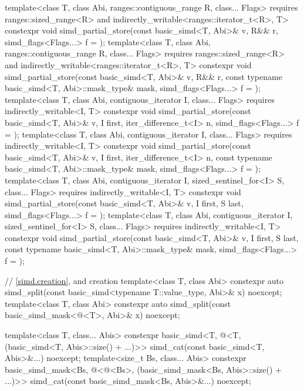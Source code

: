\begin{codeblock}
{  template<class T, class Abi, ranges::contiguous_range R, class... Flags>
    requires ranges::sized_range<R> and indirectly_writable<ranges::iterator_t<R>, T>
    constexpr void simd_partial_store(const basic_simd<T, Abi>& v, R&& r, simd_flags<Flags...> f = {});
  template<class T, class Abi, ranges::contiguous_range R, class... Flags>
    requires ranges::sized_range<R> and indirectly_writable<ranges::iterator_t<R>, T>
    constexpr void simd_partial_store(const basic_simd<T, Abi>& v, R&& r,
                            const typename basic_simd<T, Abi>::mask_type& mask,
                            simd_flags<Flags...> f = {});
  template<class T, class Abi, contiguous_iterator I, class... Flags>
    requires indirectly_writable<I, T>
    constexpr void simd_partial_store(const basic_simd<T, Abi>& v, I first, iter_difference_t<I> n,
                            simd_flags<Flags...> f = {});
  template<class T, class Abi, contiguous_iterator I, class... Flags>
    requires indirectly_writable<I, T>
    constexpr void simd_partial_store(const basic_simd<T, Abi>& v, I first, iter_difference_t<I> n,
                            const typename basic_simd<T, Abi>::mask_type& mask,
                            simd_flags<Flags...> f = {});
  template<class T, class Abi, contiguous_iterator I, sized_sentinel_for<I> S, class... Flags>
    requires indirectly_writable<I, T>
    constexpr void simd_partial_store(const basic_simd<T, Abi>& v, I first, S last, simd_flags<Flags...> f = {});
  template<class T, class Abi, contiguous_iterator I, sized_sentinel_for<I> S, class... Flags>
    requires indirectly_writable<I, T>
    constexpr void simd_partial_store(const basic_simd<T, Abi>& v, I first, S last,
                            const typename basic_simd<T, Abi>::mask_type& mask,
                            simd_flags<Flags...> f = {});

  // \ref{simd.creation},  and  creation
  template<class T, class Abi>
    constexpr auto
      simd_split(const basic_simd<typename T::value_type, Abi>& x) noexcept;
  template<class T, class Abi>
    constexpr auto
      simd_split(const basic_simd_mask<@\maskelementsize@<T>, Abi>& x) noexcept;

  template<class T, class... Abis>
    constexpr basic_simd<T, @\deducet@<T, (basic_simd<T, Abis>::size() + ...)>>
      simd_cat(const basic_simd<T, Abis>&...) noexcept;
  template<size_t Bs, class... Abis>
    constexpr basic_simd_mask<Bs, @\deducet@<@\integerfrom@<Bs>,
                              (basic_simd_mask<Bs, Abis>::size() + ...)>>
      simd_cat(const basic_simd_mask<Bs, Abis>&...) noexcept;

}
\end{codeblock}
